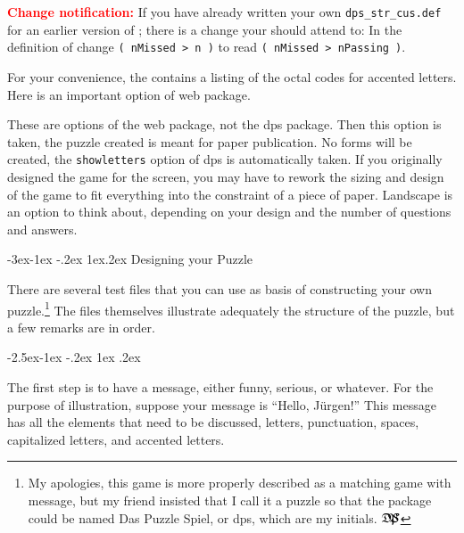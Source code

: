 \documentclass{article}
\makeatletter
\def\dps{$\hbox{$\mathfrak D$\kern-.3em\hbox{$\mathfrak P$}%
   \kern-.6em \hbox{$\mathcal S$}}$}
\renewcommand{\section}{%
   \renewcommand{\@seccntformat}[1]{\csname the##1\endcsname.\enspace}%
   \@startsection{section}{1}{-62.5pt}%
   {-3ex\@plus -1ex \@minus-.2ex}%
   {1ex\@plus .2ex}%
   {\noindent\normalfont\large\bfseries\color{blue}}}%
\renewcommand\subsection{%
   \renewcommand{\@seccntformat}[1]{\csname the##1\endcsname.\enspace}%
   \@startsection{subsection}{2}{-42.5pt}%
   {-2.5ex\@plus -1ex \@minus -.2ex}%
   {1ex \@plus .2ex}%
   {\noindent\normalfont\normalsize\bfseries\color{blue}}}
\makeatother
\begin{document}
\begin{description}
    \textbf{\textcolor{red}{Change notification:}} If you have already written
    your own \texttt{dps\_str\_cus.def} for an earlier version of ;
    there is a change your should attend to: In the definition of
     change \texttt{(\,nMissed\,>\,n\,)} to read \texttt{(\,nMissed\,>\,nPassing\,)}.

\newtopic\noindent\makebox[0pt][r]{\large\color{red}$\blacktriangleright$\enspace}\ignorespaces
For your convenience, the  contains a
listing of the octal codes for accented letters.
Here is an important option of \textsf{web} package.

\item[\normalfont{\opt{forpaper/forcolorpaper}}:] These are options
of the \textsf{web} package, not the \textsf{dps} package. Then this
option is taken, the puzzle created is meant for paper publication.
No  forms will be created, the \texttt{showletters} option of
\textsf{dps} is automatically taken. If you originally designed the
game for the screen, you may have to rework the sizing and design of
the game to fit everything into the constraint of a piece of paper.
Landscape is an option to think about, depending on your design and
the number of questions and answers.
\end{description}


\section{Designing your Puzzle}

There are several test files that you can use as basis of
constructing your own puzzle.\footnote{My apologies, this game is
more properly described as a matching game with message, but my
friend insisted that I call it a puzzle so that the package could be
named Das Puzzle Spiel, or dps, which are my initials. \dps} The
files themselves illustrate adequately the structure of the puzzle,
but a few remarks are in order.

\subsection{\texorpdfstring{\protect{}}{\textbackslash DeclarePuzzle}}\label{s:DP}

The first step is to have a message, either funny, serious, or
whatever. For the purpose of illustration, suppose your message is
``Hello, J\"{u}rgen!'' This message has all the elements that need
to be discussed, letters, punctuation, spaces, capitalized letters,
and accented letters.
\end{document}

